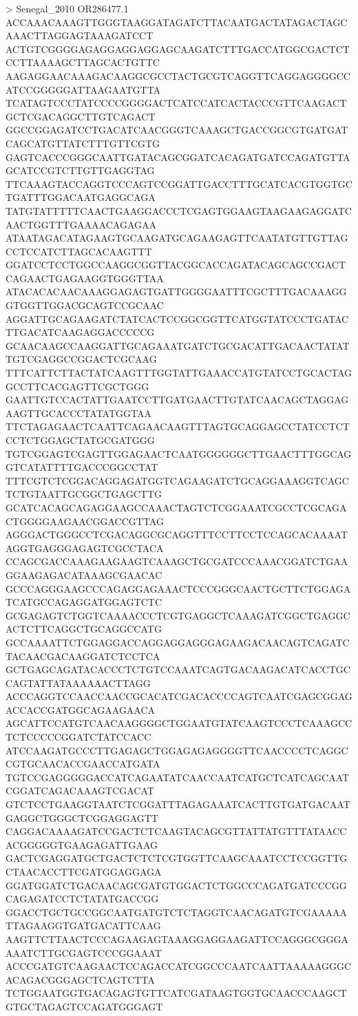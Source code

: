 > Senegal_2010 OR286477.1
ACCAAACAAAGTTGGGTAAGGATAGATCTTACAATGACTATAGACTAGCAAACTTAGGAGTAAAGATCCT
ACTGTCGGGGAGAGGAGGAGGAGCAAGATCTTTGACCATGGCGACTCTCCTTAAAAGCTTAGCACTGTTC
AAGAGGAACAAAGACAAGGCGCCTACTGCGTCAGGTTCAGGAGGGGCCATCCGGGGGATTAAGAATGTTA
TCATAGTCCCTATCCCCGGGGACTCATCCATCACTACCCGTTCAAGACTGCTCGACAGGCTTGTCAGACT
GGCCGGAGATCCTGACATCAACGGGTCAAAGCTGACCGGCGTGATGATCAGCATGTTATCTTTGTTCGTG
GAGTCACCCGGGCAATTGATACAGCGGATCACAGATGATCCAGATGTTAGCATCCGTCTTGTTGAGGTAG
TTCAAAGTACCAGGTCCCAGTCCGGATTGACCTTTGCATCACGTGGTGCTGATTTGGACAATGAGGCAGA
TATGTATTTTTCAACTGAAGGACCCTCGAGTGGAAGTAAGAAGAGGATCAACTGGTTTGAAAACAGAGAA
ATAATAGACATAGAAGTGCAAGATGCAGAAGAGTTCAATATGTTGTTAGCCTCCATCTTAGCACAAGTTT
GGATCCTCCTGGCCAAGGCGGTTACGGCACCAGATACAGCAGCCGACTCAGAACTGAGAAGGTGGGTTAA
ATACACACAACAAAGGAGAGTGATTGGGGAATTTCGCTTTGACAAAGGGTGGTTGGACGCAGTCCGCAAC
AGGATTGCAGAAGATCTATCACTCCGGCGGTTCATGGTATCCCTGATACTTGACATCAAGAGGACCCCCG
GCAACAAGCCAAGGATTGCAGAAATGATCTGCGACATTGACAACTATATTGTCGAGGCCGGACTCGCAAG
TTTCATTCTTACTATCAAGTTTGGTATTGAAACCATGTATCCTGCACTAGGCCTTCACGAGTTCGCTGGG
GAATTGTCCACTATTGAATCCTTGATGAACTTGTATCAACAGCTAGGAGAAGTTGCACCCTATATGGTAA
TTCTAGAGAACTCAATTCAGAACAAGTTTAGTGCAGGAGCCTATCCTCTCCTCTGGAGCTATGCGATGGG
TGTCGGAGTCGAGTTGGAGAACTCAATGGGGGGCTTGAACTTTGGCAGGTCATATTTTGACCCGGCCTAT
TTTCGTCTCGGACAGGAGATGGTCAGAAGATCTGCAGGAAAGGTCAGCTCTGTAATTGCGGCTGAGCTTG
GCATCACAGCAGAGGAAGCCAAACTAGTCTCGGAAATCGCCTCGCAGACTGGGGAAGAACGGACCGTTAG
AGGGACTGGGCCTCGACAGGCGCAGGTTTCCTTCCTCCAGCACAAAATAGGTGAGGGAGAGTCGCCTACA
CCAGCGACCAAAGAAGAAGTCAAAGCTGCGATCCCAAACGGATCTGAAGGAAGAGACATAAAGCGAACAC
GCCCAGGGAAGCCCAGAGGAGAAACTCCCGGGCAACTGCTTCTGGAGATCATGCCAGAGGATGGAGTCTC
GCGAGAGTCTGGTCAAAACCCTCGTGAGGCTCAAAGATCGGCTGAGGCACTCTTCAGGCTGCAGGCCATG
GCCAAAATTCTGGAGGACCAGGAGGAGGGAGAAGACAACAGTCAGATCTACAACGACAAGGATCTCCTCA
GCTGAGCAGATACACCCTCTGTCCAAATCAGTGACAAGACATCACCTGCCAGTATTATAAAAAACTTAGG
ACCCAGGTCCAACCAACCGCACATCGACACCCCAGTCAATCGAGCGGAGACCACCGATGGCAGAAGAACA
AGCATTCCATGTCAACAAGGGGCTGGAATGTATCAAGTCCCTCAAAGCCTCTCCCCCGGATCTATCCACC
ATCCAAGATGCCCTTGAGAGCTGGAGAGAGGGGTTCAACCCCTCAGGCCGTGCAACACCGAACCATGATA
TGTCCGAGGGGGACCATCAGAATATCAACCAATCATGCTCATCAGCAATCGGATCAGACAAAGTCGACAT
GTCTCCTGAAGGTAATCTCGGATTTAGAGAAATCACTTGTGATGACAATGAGGCTGGGCTCGGAGGAGTT
CAGGACAAAAGATCCGACTCTCAAGTACAGCGTTATTATGTTTATAACCACGGGGGTGAAGAGATTGAAG
GACTCGAGGATGCTGACTCTCTCGTGGTTCAAGCAAATCCTCCGGTTGCTAACACCTTCGATGGAGGAGA
GGATGGATCTGACAACAGCGATGTGGACTCTGGCCCAGATGATCCCGGCAGAGATCCTCTATATGACCGG
GGACCTGCTGCCGGCAATGATGTCTCTAGGTCAACAGATGTCGAAAAATTAGAAGGTGATGACATTCAAG
AAGTTCTTAACTCCCAGAAGAGTAAAGGAGGAAGATTCCAGGGCGGGAAAATCTTGCGAGTCCCGGAAAT
ACCCGATGTCAAGAACTCCAGACCATCGGCCCAATCAATTAAAAAGGGCACAGACGGGAGCTCAGTCTTA
TCTGGAATGGTGACAGAGTGTTCATCGATAAGTGGTGCAACCCAAGCTGTGCTAGAGTCCAGATGGGAGT
